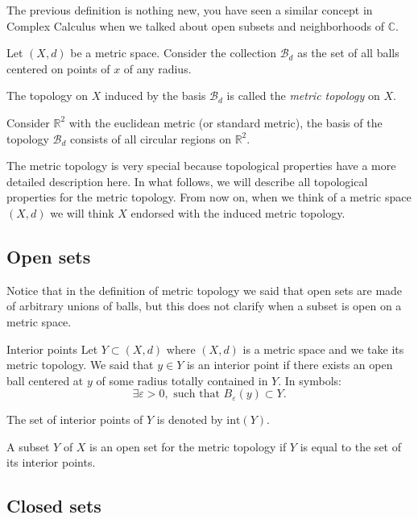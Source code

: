 \documentclass[
	fontsize=10pt, %
	twoside=false, %
	secnumdepth=1, %
]{kaobook}
\begin{document}
The previous definition is nothing new, you have seen a similar concept in Complex Calculus when we talked about open subsets and neighborhoods of $\mathbb{C}.$

\begin{definition}
Let $(X,d)$ be a metric space. Consider the collection $\mathcal{B}_d$ as the set of all balls centered on points of $x$ of any radius. 

The topology on $X$ induced by the basis $\mathcal{B}_d$ is called the \emph{metric topology} on $X.$
\end{definition}

\begin{example}
Consider $\mathbb{R}^2$ with the euclidean metric (or standard metric), the basis of the topology $\mathcal{B}_d$ consists of all circular regions on $\mathbb{R}^2.$
\end{example}

The metric topology is very special because topological properties have a more detailed description here. In what follows, we will describe all topological properties for the metric topology. From now on, when we think of a metric space $(X,d)$ we will think $X$ endorsed with the induced metric topology.

\subsection{Open sets}

Notice that in the definition of metric topology we said that open sets are made of arbitrary unions of balls, but this does not clarify when a subset is open on a metric space. 

\begin{definition}{Interior points}
Let $Y\subset (X,d)$ where $(X,d)$ is a metric space and we take its metric topology. We said that $y\in Y$ is an interior point if there exists an open ball centered at $y$ of some radius totally contained in $Y.$ In symbols: $$\exists \varepsilon >0,\mbox{ such that } B_\varepsilon(y)\subset Y.$$

The set of interior points of $Y$ is denoted by $\mbox{int}(Y).$
\end{definition}

A subset $Y$ of $X$ is an open set for the metric topology if $Y$ is equal to the set of its interior points.

\subsection{Closed sets}
\end{document}
